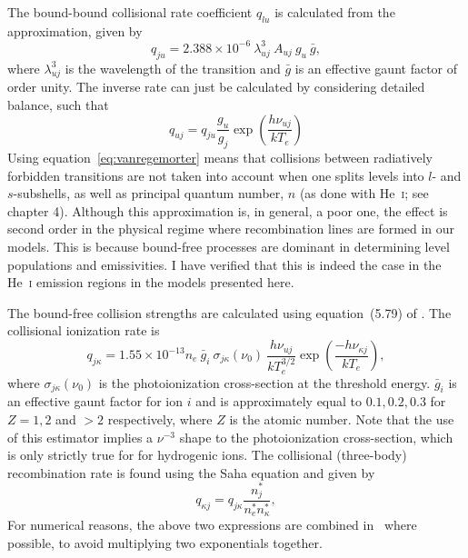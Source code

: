 The bound-bound collisional rate coefficient $q_{lu}$ is calculated from the
\cite{vanregemorter} approximation, given by
\begin{equation}
q_{ju} = 2.388 \times 10^{-6}~\lambda_{uj}^3~A_{uj}~g_u~\bar{g},
\label{eq:vanregemorter}
\end{equation}
where $\lambda_{uj}^3$ is the wavelength of the transition and $\bar{g}$ is 
an effective gaunt factor of order unity.
The inverse rate can just be calculated by considering detailed balance, 
such that
\begin{equation}
q_{uj} = q_{ju} \frac{g_u}{g_j} \exp \left( \frac{h \nu_{uj}}{k T_e} \right)
\label{eq:vanregemorterw}
\end{equation}
Using equation~\ref{eq:vanregemorter} means that collisions between radiatively
forbidden transitions are not taken into account when one 
splits levels into $l$- and $s$-subshells, as well
as principal quantum number, $n$ (as done with He~\textsc{i}; 
see chapter 4). Although this approximation is, in general, 
a poor one, the effect is second order in the physical 
regime where recombination lines are formed in our models. 
This is because bound-free processes are dominant in determining 
level populations and emissivities. I have verified that this 
is indeed the case in the He~\textsc{i} emission regions in the models
presented here.

The bound-free collision strengths are calculated using equation~(5.79) of
\cite{mihalas}. The collisional ionization rate is
\begin{equation}
q_{j\kappa} = 1.55 \times 10^{-13} n_e~\bar{g}_{i}~\sigma_{j\kappa} (\nu_0)~
\frac{h \nu_{uj}}{k T_e^{3/2}}
\exp \left( \frac{- h \nu_{\kappa j}}{k T_e} \right),
\label{eq:vanregemorterw}
\end{equation}
where $\sigma_{j\kappa} (\nu_0)$ is the photoionization cross-section 
at the threshold energy.
$\bar{g}_{i}$ is an effective gaunt factor for ion $i$ and is approximately
equal to $0.1,0.2,0.3$ for $Z=1,2$ and $>2$ respectively,
where $Z$ is the atomic number. Note that the use of this estimator
implies a $\nu^{-3}$ shape to the photoionization cross-section,
which is only strictly true for for hydrogenic ions.
The collisional (three-body) recombination rate is found using the Saha equation
and given by
\begin{equation}
q_{\kappa j} = q_{j\kappa} \frac{n_j^*}{n_e^* n_\kappa^*},
\label{eq:vanregemorterw}
\end{equation}
For numerical reasons, the above two expressions are combined in \py\ where 
possible, to avoid multiplying two exponentials together.





